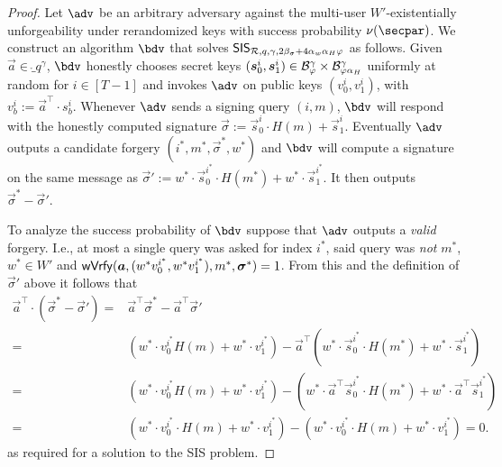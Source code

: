 \begin{proof}
  Let $\adv$ be an arbitrary adversary against the multi-user $W'$-existentially unforgeability under rerandomized keys with success probability $\nu(\secpar)$.
  We construct an algorithm $\bdv$ that solves $\mathsf{SIS}_{\mathcal{R},q,\gamma,2\beta_\sigma + 4\alpha_w\alpha_H\varphi}$ as follows.
  Given $\vec{a}\in\ring_q^\gamma$, $\bdv$ honestly chooses secret keys $(\boldsymbol{s}^i_0,\boldsymbol{s}^i_1) \in \mathcal{B}_{\varphi}^\gamma\times \mathcal{B}_{\varphi\alpha_H}^\gamma$ uniformly at random for $i\in[T-1]$ and invokes $\adv$ on public keys $(v^i_0,v^i_1)$, with $v^i_b := \vec{a}^\intercal\cdot s^i_b$.
  Whenever $\adv$ sends a signing query $(i,m)$, $\bdv$ will respond with the honestly computed signature $\vec{\sigma}:=\vec{s}^i_0\cdot H(m)+ \vec{s}^i_1$.
  Eventually $\adv$ outputs a candidate forgery $(i^*,m^*,\vec{\sigma}^*,w^*)$ and $\bdv$ will compute a signature on the same message as $\vec{\sigma}' := w^*\cdot\vec{s}^{i^*}_0\cdot H(m^*)+ w^*\cdot\vec{s}^{i^*}_1$.
  It then outputs $\vec{\sigma}^*-\vec{\sigma}'$.
  
  To analyze the success probability of $\bdv$ suppose that $\adv$ outputs a \emph{valid} forgery.
  I.e., at most a single query was asked for index $i^*$, said query was \emph{not} $m^*$, $w^*\in W'$ and $\mathsf{wVrfy}(\boldsymbol{a},(w^*v^{i^*}_0,w^*v^{i^*}_1),m^*,\allowbreak\boldsymbol{\sigma}^*)=1$.
  From this and the definition of $\vec{\sigma}'$ above it follows that
  \begin{align*}
       \vec{a}^\intercal\cdot(\vec{\sigma}^*-\vec{\sigma}') ={}& \vec{a}^\intercal\vec{\sigma}^*-\vec{a}^\intercal\vec{\sigma}'\\ 
    ={}& (w^*\cdot v^{i^*}_0 H(m) + w^*\cdot v^{i^*}_1) - \vec{a}^\intercal(w^*\cdot \vec{s}^{i^*}_0\cdot H(m^*)+ w^*\cdot\vec{s}^{i^*}_1)\\
    ={}& (w^*\cdot v^{i^*}_0 H(m) + w^*\cdot v^{i^*}_1) - (w^*\cdot\vec{a}^\intercal\vec{s}^{i^*}_0\cdot H(m^*)+ w^*\cdot\vec{a}^\intercal\vec{s}^{i^*}_1)\\
    ={}& (w^*\cdot v^{i^*}_0\cdot H(m) + w^*\cdot v^{i^*}_1) - (w^*\cdot v^{i^*}_0\cdot H(m) + w^*\cdot v^{i^*}_1) = 0.
  \end{align*}
  as required for a solution to the SIS problem.
  

\end{proof}
